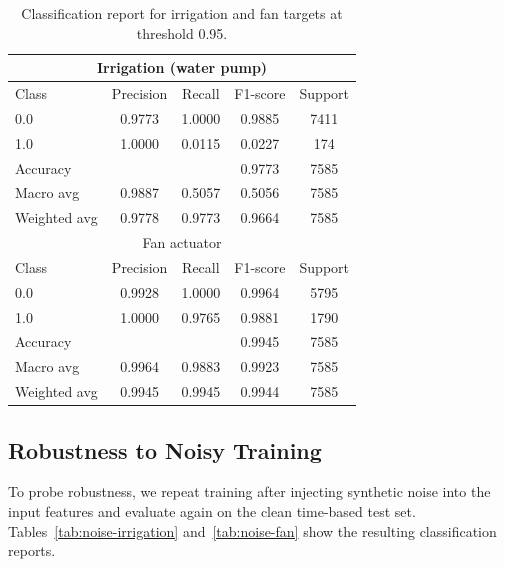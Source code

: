 \documentclass[sn-mathphys,Numbered]{sn-jnl}
\begin{document}
\begin{table}[ht]
    \centering
    \caption{Classification report for irrigation and fan targets at threshold 0.95.}
    \label{tab:thr-0.95}
    \begin{tabular}{lcccc}
        \toprule
        \multicolumn{5}{c}{Irrigation (water pump)} \\
        \midrule
        Class & Precision & Recall & F1-score & Support \\
        \midrule
        0.0 & 0.9773 & 1.0000 & 0.9885 & 7411 \\
        1.0 & 1.0000 & 0.0115 & 0.0227 & 174 \\
        \midrule
        Accuracy     &        &        & 0.9773 & 7585 \\
        Macro avg    & 0.9887 & 0.5057 & 0.5056 & 7585 \\
        Weighted avg & 0.9778 & 0.9773 & 0.9664 & 7585 \\
        \midrule
        \multicolumn{5}{c}{Fan actuator} \\
        \midrule
        Class & Precision & Recall & F1-score & Support \\
        \midrule
        0.0 & 0.9928 & 1.0000 & 0.9964 & 5795 \\
        1.0 & 1.0000 & 0.9765 & 0.9881 & 1790 \\
        \midrule
        Accuracy     &        &        & 0.9945 & 7585 \\
        Macro avg    & 0.9964 & 0.9883 & 0.9923 & 7585 \\
        Weighted avg & 0.9945 & 0.9945 & 0.9944 & 7585 \\
        \bottomrule
    \end{tabular}
\end{table}

\subsection{Robustness to Noisy Training}

To probe robustness, we repeat training after injecting synthetic noise into the input features and evaluate again on the clean time-based test set.  
Tables~\ref{tab:noise-irrigation} and~\ref{tab:noise-fan} show the resulting classification reports.
\end{document}
